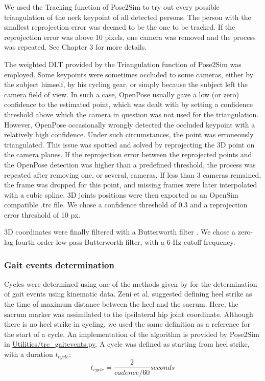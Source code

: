 We used the Tracking function of Pose2Sim to try out every possible triangulation of the neck keypoint of all detected persons. The person with the smallest reprojection error was deemed to be the one to be tracked. If the reprojection error was above 10 pixels, one camera was removed and the process was repeated. See  Chapter 3 for more details.

The weighted DLT provided by the Triangulation function of Pose2Sim was employed. Some keypoints were sometimes occluded to some cameras, either by the subject himself, by his cycling gear, or simply because the subject left the camera field of view. In such a case, OpenPose usually gave a low (or zero) confidence to the estimated point, which was dealt with by setting a confidence threshold above which the camera in question was not used for the triangulation. However, OpenPose occasionally wrongly detected the occluded keypoint with a relatively high confidence. Under such circumstances, the point was erroneously triangulated. This issue was spotted and solved by reprojecting the 3D point on the camera planes. If the reprojection error between the reprojected points and the OpenPose detection was higher than a predefined threshold, the process was repeated after removing one, or several, cameras. If less than 3 cameras remained, the frame was dropped for this point, and missing frames were later interpolated with a cubic spline. 3D joints positions were then exported as an OpenSim compatible .trc file.
We chose a confidence threshold of 0.3 and a reprojection error threshold of 10 px.

3D coordinates were finally filtered with a Butterworth filter \cite{Butterworth1930}. We chose a zero-lag fourth order low-pass Butterworth filter, with a 6 Hz cutoff frequency.

\subsubsection{Gait events determination}

Cycles were determined using one of the methods given by \cite{Zeni2008} for the determination of gait events using kinematic data. Zeni et al. suggested defining heel strike as the time of maximum distance between the heel and the sacrum. Here, the sacrum marker was assimilated to the ipsilateral hip joint coordinate. Although there is no heel strike in cycling, we used the same definition as a reference for the start of a cycle. An implementation of the algorithm is provided by Pose2Sim in \href{https://github.com/perfanalytics/pose2sim/blob/main/Pose2Sim/Utilities/trc_gaitevents.py}{Utilities/trc\_gaitevents.py}. A cycle was defined as starting from heel strike, with a duration \(t_{cycle}\):
\begin{equation}
      t_{cycle} = \frac{2}{cadence/60}seconds
\end{equation}

